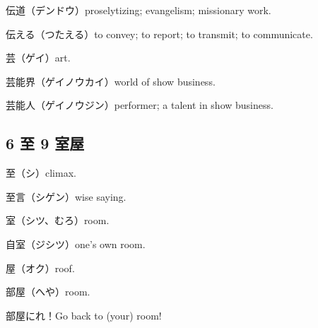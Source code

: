 伝道（デンドウ）proselytizing; evangelism; missionary work.

伝える（つたえる）to convey; to report; to transmit; to communicate.

芸（ゲイ）art.

芸能界（ゲイノウカイ）world of show business.

芸能人（ゲイノウジン）performer; a talent in show business.

\subsection{6 至 9 室屋}

至（シ）climax.

至言（シゲン）wise saying.

室（シツ、むろ）room.

自室（ジシツ）one's own room.

屋（オク）roof.

部屋（へや）room.

部屋にれ！Go back to (your) room!
